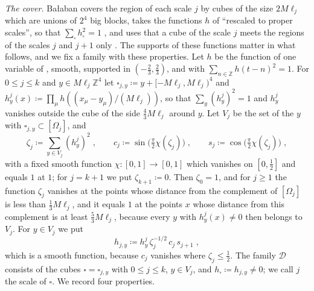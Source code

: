 \documentclass[11pt]{preprint}
\numberwithin{equation}{section}
\theoremstyle{definition}
\theoremstyle{remark}
\theoremstyle{plain}
\begin{document}
\emph{The cover.} Ba{\l}aban covers the region of each scale $j$ by cubes of the size $2M\ell_j$ which are unions of $2^4$ big blocks, takes the functions $h$ of \cite[(1.118)]{BalabanPRT1} ``rescaled to proper scales'', so that $\sum_\square h_\square^2 = 1$ \cite[(2.36), p.~229]{BalabanPRT2}, and uses that a cube of the scale $j$ meets the regions of the scales $j$ and $j + 1$ only \cite[p.~230]{BalabanPRT2}. The supports of these functions matter in what follows, and we fix a family with these properties. Let $h$ be the function of one variable of \cite[(1.118)]{BalabanPRT1}, smooth, supported in $(-\frac23, \frac23)$, and with $\sum_{n \in \mathbb Z}h(t - n)^2 = 1$. For $0 \leq j \leq k$ and $y \in M\ell_j\mathbb Z^4$ let $\square_{j,y} \coloneqq y + [-M\ell_j, M\ell_j)^4$ and $h^j_y(x) \coloneqq \prod_\mu h((x_\mu - y_\mu)/(M\ell_j))$, so that $\sum_y(h^j_y)^2 = 1$ and $h^j_y$ vanishes outside the cube of the side $\frac43M\ell_j$ around $y$. Let $V_j$ be the set of the $y$ with $\square_{j,y} \subset [\Omega_j]$, and
\begin{equation}\label{eq:cover-functions}
    \zeta_j \coloneqq \sum_{y \in V_j}(h^j_y)^2\;,
    \qquad
    c_j \coloneqq \sin\bigl(\tfrac\pi2\chi(\zeta_j)\bigr)\;,
    \qquad
    s_j \coloneqq \cos\bigl(\tfrac\pi2\chi(\zeta_j)\bigr)\;,
\end{equation}
with a fixed smooth function $\chi \colon [0, 1] \to [0, 1]$ which vanishes on $[0, \frac12]$ and equals $1$ at $1$; for $j = k + 1$ we put $\zeta_{k+1} \coloneqq 0$. Then $\zeta_0 = 1$, and for $j \geq 1$ the function $\zeta_j$ vanishes at the points whose distance from the complement of $[\Omega_j]$ is less than $\frac13M\ell_j$, and it equals $1$ at the points $x$ whose distance from this complement is at least $\frac53M\ell_j$, because every $y$ with $h^j_y(x) \neq 0$ then belongs to $V_j$. For $y \in V_j$ we put
\begin{equation}\label{eq:cover}
    h_{j,y} \coloneqq h^j_y\,\zeta_j^{-1/2}\,c_j\,s_{j+1}\;,
\end{equation}
which is a smooth function, because $c_j$ vanishes where $\zeta_j \leq \frac12$. The family $\mathscr D$ consists of the cubes $\square = \square_{j,y}$ with $0 \leq j \leq k$, $y \in V_j$, and $h_\square \coloneqq h_{j,y} \neq 0$; we call $j$ the scale of $\square$. We record four properties.
\end{document}
